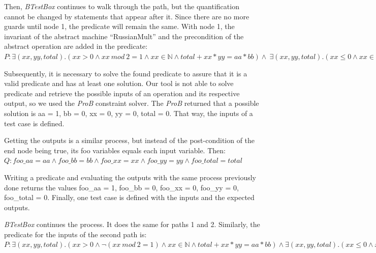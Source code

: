 \documentclass[runningheads]{llncs}
\begin{document}
Then, \textit{BTestBox} continues to walk through the path, but the quantification cannot be changed by statements that appear after it. Since there are no more guards until node 1, the predicate will remain the same. With node 1, the invariant of the abstract machine ``RussianMult'' and the precondition of the abstract operation are added in the predicate: 
$P: \exists(xx, yy, total).(xx > 0 \wedge xx\ mod\ 2 = 1 \wedge xx \in \mathbb{N} \wedge total + xx * yy = aa * bb) \wedge \ \exists(xx, yy, total).(xx \leq 0 \wedge xx \in \mathbb{N} \wedge total + xx * yy = aa * bb) \wedge xx : NAT \wedge yy : NAT \wedge total : NAT \wedge aa : NAT \wedge bb : NAT$ 

Subsequently, it is necessary to solve the found predicate to assure that it is a valid predicate and has at least one solution. Our tool is not able to solve predicate and retrieve the possible inputs of an operation and its respective output, so we used the \textit{ProB} constraint solver. The \textit{ProB} returned that a possible solution is aa = 1, bb = 0, xx = 0, yy = 0, total = 0. That way, the inputs of a test case is defined.

Getting the outputs is a similar process, but instead of the post-condition of the end node being true, its foo variables equals each input variable. Then:
$Q : foo\_aa = aa \wedge foo\_bb = bb \wedge foo\_xx = xx \wedge foo\_yy = yy \wedge foo\_total = total$ 

Writing a predicate and evaluating the outputs with the same process previously done returns the values foo\_aa = 1, foo\_bb = 0, foo\_xx = 0, foo\_yy = 0, foo\_total = 0. Finally, one test case is defined with the inputs and the expected outputs.

\textit{BTestBox} continues the process. It does the same for paths 1 and 2. Similarly, the predicate for the inputs of the second path is:
$P : \exists (xx, yy, total).(xx > 0 \wedge \neg(xx\ mod\ 2 = 1) \wedge xx \in \mathbb{N} \wedge total + xx * yy = aa * bb) \wedge \exists(xx, yy, total).(xx \leq 0 \wedge xx \in \mathbb{N} \wedge total + xx * yy = aa * bb) \wedge xx : NAT \wedge yy : NAT \wedge total : NAT \wedge aa : NAT \wedge bb : NAT$ 
\end{document}
